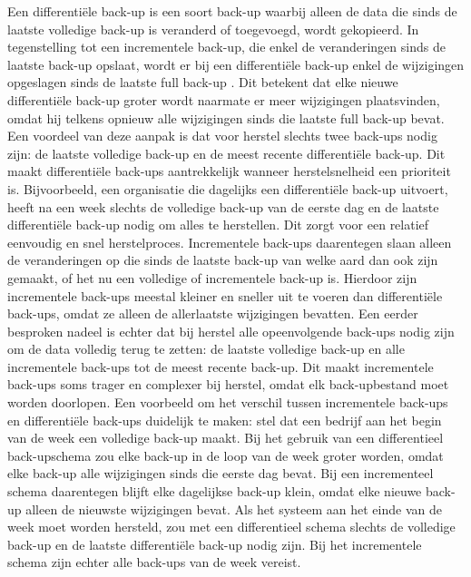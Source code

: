 Een differentiële back-up is een soort back-up waarbij alleen de data die sinds de laatste volledige back-up is veranderd of toegevoegd, wordt gekopieerd. In tegenstelling tot een incrementele back-up, die enkel de veranderingen sinds de laatste back-up opslaat, wordt er bij een differentiële back-up enkel de wijzigingen opgeslagen sinds de laatste full back-up \autocite{Beard2018}. Dit betekent dat elke nieuwe differentiële back-up groter wordt naarmate er meer wijzigingen plaatsvinden, omdat hij telkens opnieuw alle wijzigingen sinds die laatste full back-up bevat. Een voordeel van deze aanpak is dat voor herstel slechts twee back-ups nodig zijn: de laatste volledige back-up en de meest recente differentiële back-up. Dit maakt differentiële back-ups aantrekkelijk wanneer herstelsnelheid een prioriteit is. Bijvoorbeeld, een organisatie die dagelijks een differentiële back-up uitvoert, heeft na een week slechts de volledige back-up van de eerste dag en de laatste differentiële back-up nodig om alles te herstellen. Dit zorgt voor een relatief eenvoudig en snel herstelproces. Incrementele back-ups daarentegen slaan alleen de veranderingen op die sinds de laatste back-up van welke aard dan ook zijn gemaakt, of het nu een volledige of incrementele back-up is. Hierdoor zijn incrementele back-ups meestal kleiner en sneller uit te voeren dan differentiële back-ups, omdat ze alleen de allerlaatste wijzigingen bevatten. Een eerder besproken nadeel is echter dat bij herstel alle opeenvolgende back-ups nodig zijn om de data volledig terug te zetten: de laatste volledige back-up en alle incrementele back-ups tot de meest recente back-up. Dit maakt incrementele back-ups soms trager en complexer bij herstel, omdat elk back-upbestand moet worden doorlopen. Een voorbeeld om het verschil tussen incrementele back-ups en differentiële back-ups duidelijk te maken: stel dat een bedrijf aan het begin van de week een volledige back-up maakt. Bij het gebruik van een differentieel back-upschema zou elke back-up in de loop van de week groter worden, omdat elke back-up alle wijzigingen sinds die eerste dag bevat. Bij een incrementeel schema daarentegen blijft elke dagelijkse back-up klein, omdat elke nieuwe back-up alleen de nieuwste wijzigingen bevat. Als het systeem aan het einde van de week moet worden hersteld, zou met een differentieel schema slechts de volledige back-up en de laatste differentiële back-up nodig zijn. Bij het incrementele schema zijn echter alle back-ups van de week vereist.


